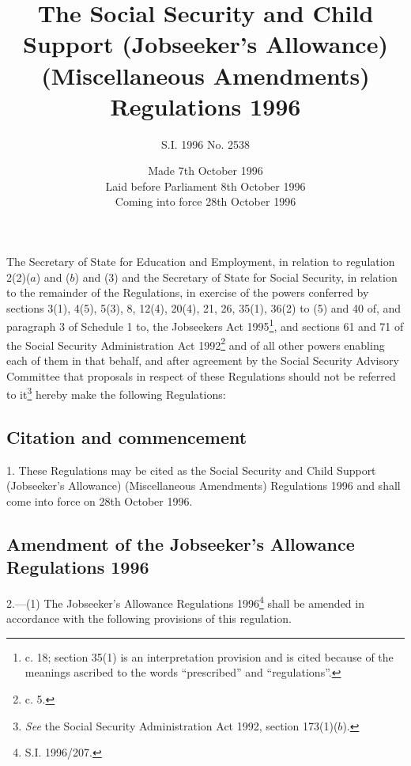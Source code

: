 \documentclass[a4paper]{article}
\title{The Social Security and Child Support (Jobseeker’s Allowance) (Miscellaneous Amendments) Regulations 1996}
\author{S.I. 1996 No. 2538}
\date{Made 7th October 1996\\Laid before Parliament 8th October 1996\\Coming into force 28th October 1996}
\begin{document}
\maketitle

\noindent
The Secretary of State for Education and Employment, in relation to regulation 2(2)($a$) and ($b$) and (3) and the Secretary of State for Social Security, in relation to the remainder of the Regulations, in exercise of the powers conferred by sections 3(1), 4(5), 5(3), 8, 12(4), 20(4), 21, 26, 35(1), 36(2) to (5) and 40 of, and paragraph 3 of Schedule 1 to, the Jobseekers Act 1995\footnote{ c. 18; section 35(1) is an interpretation provision and is cited because of the meanings ascribed to the words “prescribed” and “regulations”.}, and sections 61 and 71 of the Social Security Administration Act 1992\footnote{ c. 5.} and of all other powers enabling each of them in that behalf, and after agreement by the Social Security Advisory Committee that proposals in respect of these Regulations should not be referred to it\footnote{\frenchspacing \emph{See} the Social Security Administration Act 1992, section 173(1)($b$).} hereby make the following Regulations:

{\sloppy

\tableofcontents

}

\setcounter{secnumdepth}{-2}

\subsection[1. Citation and commencement]{Citation and commencement}

1.  These Regulations may be cited as the Social Security and Child Support (Jobseeker’s Allowance) (Miscellaneous Amendments) Regulations 1996 and shall come into force on 28th October 1996.

\subsection[2. Amendment of the Jobseeker’s Allowance Regulations 1996]{Amendment of the Jobseeker’s Allowance Regulations 1996}

2.—(1) The Jobseeker’s Allowance Regulations 1996\footnote{\frenchspacing S.I. 1996/207.} shall be amended in accordance with the following provisions of this regulation.
\end{document}
